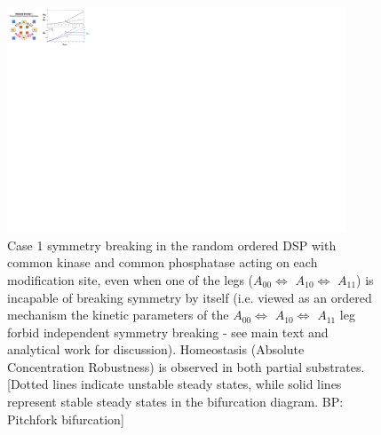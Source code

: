 \documentclass[16pt, a4paper]{article}
\begin{document}
\clearpage
\begin{figure}[ht!]
    \centering
    \includegraphics[width = 0.9\textwidth, keepaspectratio]{FigS03.pdf}
    \caption{Case 1 symmetry breaking in the random ordered DSP with common kinase and common phosphatase acting on each modification site, even when one of the legs ($A_{00} \Longleftrightarrow$ $A_{10} \Longleftrightarrow$ $A_{11}$) is incapable of breaking symmetry by itself (i.e. viewed as an ordered mechanism the kinetic parameters of the $A_{00} \Longleftrightarrow$ $A_{10} \Longleftrightarrow$ $A_{11}$ leg forbid independent symmetry breaking - see main text and analytical work for discussion). Homeostasis (Absolute Concentration Robustness) is observed in both partial substrates.
    [Dotted lines indicate unstable steady states, while solid lines represent stable steady states in the bifurcation diagram. BP: Pitchfork bifurcation]}
    \label{Fig S3}
\end{figure}
\end{document}
